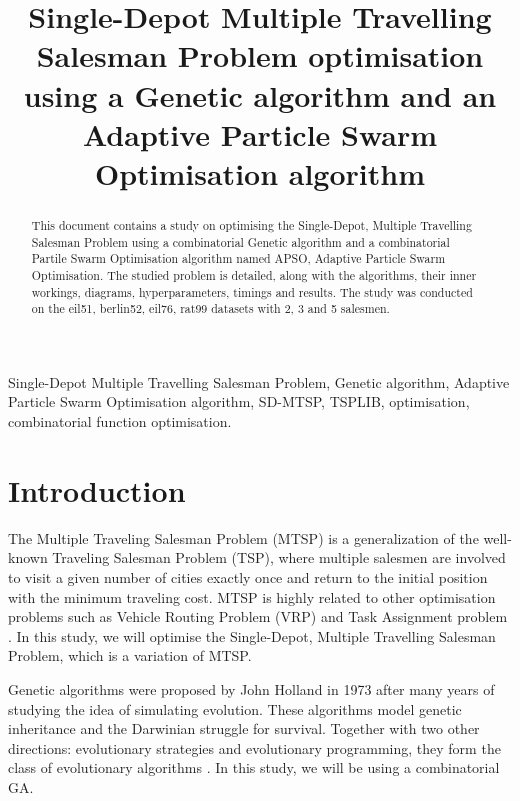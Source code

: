 \documentclass[conference]{IEEEtran}
\begin{document}
\title{Single-Depot Multiple Travelling Salesman Problem optimisation using a Genetic algorithm and an Adaptive Particle Swarm Optimisation algorithm}

\author{
}
\maketitle

\begin{abstract}
    This document contains a study on optimising the Single-Depot, Multiple Travelling Salesman Problem using a combinatorial
    Genetic algorithm and a combinatorial Partile Swarm Optimisation algorithm named APSO, Adaptive Particle Swarm Optimisation.
    The studied problem is detailed, along with the algorithms, their inner workings, diagrams, hyperparameters, timings and
    results. The study was conducted on the eil51, berlin52, eil76, rat99 datasets with 2, 3 and 5 salesmen.
\end{abstract}

\begin{IEEEkeywords}
Single-Depot Multiple Travelling Salesman Problem, Genetic algorithm, Adaptive Particle Swarm Optimisation algorithm, SD-MTSP,
TSPLIB, optimisation, combinatorial function optimisation.
\end{IEEEkeywords}

\section{Introduction}
The Multiple Traveling Salesman Problem (MTSP) is a generalization of the well-known Traveling Salesman Problem (TSP),
where multiple salesmen are involved to visit a given number of cities exactly once and return to the initial position
with the minimum traveling cost. MTSP is highly related to other optimisation problems such as Vehicle Routing Problem (VRP)
and Task Assignment problem \cite{b1}. In this study, we will optimise the Single-Depot, Multiple Travelling Salesman Problem,
which is a variation of MTSP.

Genetic algorithms were proposed by John Holland in 1973 after many years of studying the idea of simulating evolution.
These algorithms model genetic inheritance and the Darwinian struggle for survival. Together with two other directions: evolutionary
strategies and evolutionary programming, they form the class of evolutionary algorithms \cite{b2}. In this study, we will
be using a combinatorial GA.
\end{document}
